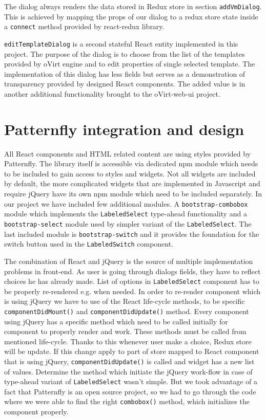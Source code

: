 The dialog always renders the data stored in Redux store in section \texttt{addVmDialog}. This is achieved by mapping the props of our dialog to a redux store state inside a \texttt{connect} method provided by react-redux library. 

\texttt{editTemplateDialog} is a second stateful React entity implemented in this project. The purpose of the dialog is to choose from the list of the templates provided by oVirt engine and to edit properties of single selected template. The implementation of this dialog has less fields but serves as a demonstration of transparency provided by designed React components. The added value is in another additional functionality brought to the oVirt-web-ui project. 

\section{Patternfly integration and design}
All React components and HTML related content are using styles provided by Patternfly. The library itself is accessible via dedicated npm module which needs to be included to gain access to styles and widgets. Not all widgets are included by default, the more complicated widgets that are implemented in Javascript and require jQuery have its own npm module which need to be included separately. In our project we have included few additional modules. A \texttt{bootstrap-combobox} module which implements the \texttt{LabeledSelect} type-ahead functionality and a \texttt{bootstrap-select} module used by simpler variant of the \texttt{LabeledSelect}. The last included module is \texttt{bootstrap-switch} and it provides the foundation for the switch button used in the \texttt{LabeledSwitch} component.

The combination of React and jQuery is the source of multiple implementation problems in front-end. As user is going through dialogs fields, they have to reflect choices he has already made. List of options in \texttt{LabeledSelect} component has to be properly re-rendered e.g. when needed. In order to re-render component which is using jQuery we have to use of the React life-cycle methods, to be specific \texttt{componentDidMount()} and \texttt{componentDidUpdate()} method. Every component using jQuery has a specific method which need to be called initially for component to properly render and work. These methods must be called from mentioned life-cycle. Thanks to this whenever user make a choice, Redux store will be update. If this change apply to part of store mapped to React component that is using jQuery, \texttt{componentDidUpdate()} is called and widget has a new list of values. 
Determine the method which initiate the jQuery work-flow in case of type-ahead variant of \texttt{LabeledSelect} wasn't simple. But we took advantage of a fact that Patternfly is an open source project, so we had to go through the code where we were able to find the right \texttt{combobox()} method, which initializes the component properly.

